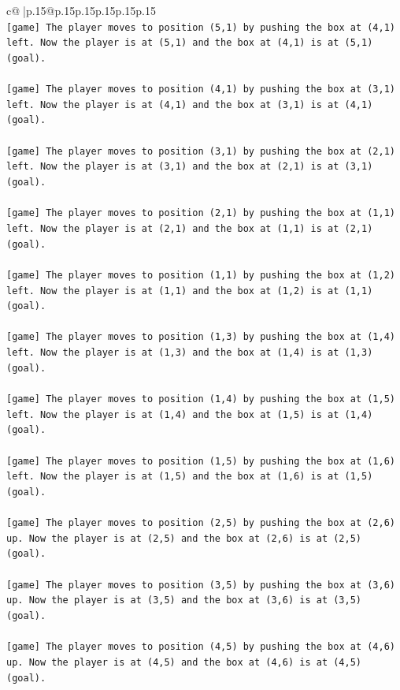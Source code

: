 \documentclass{article}
\begin{document}
{\begin{supertabular}{c@{$\;$}|p{.15\linewidth}@{}p{.15\linewidth}p{.15\linewidth}p{.15\linewidth}p{.15\linewidth}p{.15\linewidth}}
{{{\\ 
\texttt{{[}game{]} The player moves to position (5,1) by pushing the box at (4,1) left. Now the player is at (5,1) and the box at (4,1) is at (5,1) (goal).} \\
\\ 
\texttt{{[}game{]} The player moves to position (4,1) by pushing the box at (3,1) left. Now the player is at (4,1) and the box at (3,1) is at (4,1) (goal).} \\
\\ 
\texttt{{[}game{]} The player moves to position (3,1) by pushing the box at (2,1) left. Now the player is at (3,1) and the box at (2,1) is at (3,1) (goal).} \\
\\ 
\texttt{{[}game{]} The player moves to position (2,1) by pushing the box at (1,1) left. Now the player is at (2,1) and the box at (1,1) is at (2,1) (goal).} \\
\\ 
\texttt{{[}game{]} The player moves to position (1,1) by pushing the box at (1,2) left. Now the player is at (1,1) and the box at (1,2) is at (1,1) (goal).} \\
\\ 
\texttt{{[}game{]} The player moves to position (1,3) by pushing the box at (1,4) left. Now the player is at (1,3) and the box at (1,4) is at (1,3) (goal).} \\
\\ 
\texttt{{[}game{]} The player moves to position (1,4) by pushing the box at (1,5) left. Now the player is at (1,4) and the box at (1,5) is at (1,4) (goal).} \\
\\ 
\texttt{{[}game{]} The player moves to position (1,5) by pushing the box at (1,6) left. Now the player is at (1,5) and the box at (1,6) is at (1,5) (goal).} \\
\\ 
\texttt{{[}game{]} The player moves to position (2,5) by pushing the box at (2,6) up. Now the player is at (2,5) and the box at (2,6) is at (2,5) (goal).} \\
\\ 
\texttt{{[}game{]} The player moves to position (3,5) by pushing the box at (3,6) up. Now the player is at (3,5) and the box at (3,6) is at (3,5) (goal).} \\
\\ 
\texttt{{[}game{]} The player moves to position (4,5) by pushing the box at (4,6) up. Now the player is at (4,5) and the box at (4,6) is at (4,5) (goal).} \\
}}}
\end{supertabular}}
\end{document}
